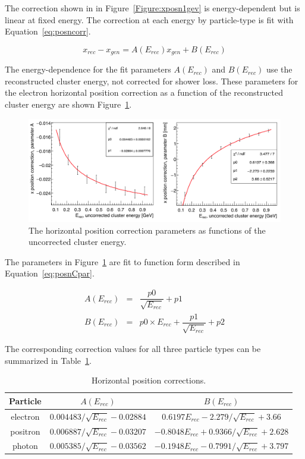 \documentclass[12pt]{report}
\begin{document}
The correction shown in in Figure~\ref{Figure:xposn1gev} is energy-dependent but is linear at fixed energy. The correction at each energy by particle-type is fit with Equation~\eqref{eq:posncorr}. 

\begin{equation}
\label{eq:posncorr}
x_{rec} - x_{gen} = A(E_{rec}) x_{gen} + B(E_{rec})
\end{equation}

The energy-dependence for the fit parameters $A(E_{rec})$ and $B(E_{rec})$ use the reconstructed cluster energy, not corrected for shower loss. These parameters for the electron horizontal position correction as a function of the reconstructed cluster energy are shown Figure~\ref{Figure:xposcorrPar}.

\begin{figure}[H]
  \centering
      \includegraphics[width=1.0\textwidth]{pics/performance/xposcorrPar.png}
  \caption[Horizontal position correction dependence for electrons]{The horizontal position correction parameters as functions of the uncorrected cluster energy.}
  \label{Figure:xposcorrPar}
\end{figure}

The parameters in Figure~\ref{Figure:xposcorrPar} are fit to function form described in Equation~\eqref{eq:posnCpar}.

\begin{eqnarray*}
\label{eq:posnCpar}
A(E_{rec}) & = & \dfrac{p0}{\sqrt{E_{rec}}}+p1\\
B(E_{rec}) & = & p0\times E_{rec} +\dfrac{p1}{\sqrt{E_{rec}}}+p2
\end{eqnarray*}

The corresponding correction values for all three particle types can be summarized in Table~\ref{tab:horizPosCorr}.

\begin{table}[H]
\caption{Horizontal position corrections.}
\label{tab:horizPosCorr}
\centering
\begin{tabular}{|c|c|c|}
\toprule
Particle & $A(E_{rec})$ & $B(E_{rec})$ \\
\midrule
electron & $0.004483/\sqrt{E_{rec}}-0.02884$ & $0.6197E_{rec}-2.279/\sqrt{E_{rec}}+3.66$ \\
positron & $0.006887/\sqrt{E_{rec}}-0.03207$ & $-0.8048E_{rec}+0.9366/\sqrt{E_{rec}}+2.628$ \\
photon & $0.005385/\sqrt{E_{rec}}-0.03562$ & $-0.1948E_{rec}-0.7991/\sqrt{E_{rec}}+3.797$ \\
\bottomrule
\end{tabular}
\end{table}
\end{document}
